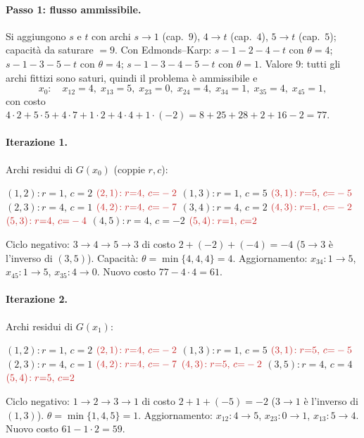 \documentclass[11pt,a4paper]{article}
\newcommand{\rd}[4]{\mbox{$(#1,#2)\!:r{=}#3,\,c{=}#4$}\hspace{1.1em}}
\newcommand{\ri}[4]{\mbox{$\textcolor{neg}{(#1,#2)\!:r{=}#3,\,c{=}#4}$}\hspace{1.1em}}
\newenvironment{resid}{\par\smallskip\noindent\small\raggedright\ignorespaces}{\par\smallskip\noindent}
\begin{document}
\begin{center}
\end{center}

\begin{sol}
\paragraph{Passo 1: flusso ammissibile.} Si aggiungono $s$ e $t$ con archi
$s\to1$ (cap.\ $9$), $4\to t$ (cap.\ $4$), $5\to t$ (cap.\ $5$); capacità da saturare $=9$.
Con Edmonds--Karp: $s\!-\!1\!-\!2\!-\!4\!-\!t$ con $\theta=4$;
$s\!-\!1\!-\!3\!-\!5\!-\!t$ con $\theta=4$; $s\!-\!1\!-\!3\!-\!4\!-\!5\!-\!t$ con $\theta=1$.
Valore $9$: tutti gli archi fittizi sono saturi, quindi il problema è ammissibile e
\[
 x_0:\quad x_{12}=4,\; x_{13}=5,\; x_{23}=0,\; x_{24}=4,\; x_{34}=1,\; x_{35}=4,\; x_{45}=1,
\]
con costo $4\cdot2+5\cdot5+4\cdot7+1\cdot2+4\cdot4+1\cdot(-2)=8+25+28+2+16-2=77$.

\paragraph{Iterazione 1.} Archi residui di $G(x_0)$ (coppie $r,c$):
\begin{resid}
\rd{1}{2}{1}{2} \ri{2}{1}{4}{-2} \rd{1}{3}{1}{5} \ri{3}{1}{5}{-5}
\rd{2}{3}{4}{1} \ri{4}{2}{4}{-7} \rd{3}{4}{4}{2} \ri{4}{3}{1}{-2}
\ri{5}{3}{4}{-4} \rd{4}{5}{4}{-2} \ri{5}{4}{1}{2}
\end{resid}
Ciclo negativo: $3\to4\to5\to3$ di costo $2+(-2)+(-4)=-4$
($5\to3$ è l'inverso di $(3,5)$). Capacità: $\theta=\min\{4,4,4\}=4$.
Aggiornamento: $x_{34}:1\to5$, $x_{45}:1\to5$, $x_{35}:4\to0$.
Nuovo costo $77-4\cdot4=61$.

\paragraph{Iterazione 2.} Archi residui di $G(x_1)$:
\begin{resid}
\rd{1}{2}{1}{2} \ri{2}{1}{4}{-2} \rd{1}{3}{1}{5} \ri{3}{1}{5}{-5}
\rd{2}{3}{4}{1} \ri{4}{2}{4}{-7} \ri{4}{3}{5}{-2} \rd{3}{5}{4}{4} \ri{5}{4}{5}{2}
\end{resid}
Ciclo negativo: $1\to2\to3\to1$ di costo $2+1+(-5)=-2$
($3\to1$ è l'inverso di $(1,3)$). $\theta=\min\{1,4,5\}=1$.
Aggiornamento: $x_{12}:4\to5$, $x_{23}:0\to1$, $x_{13}:5\to4$.
Nuovo costo $61-1\cdot2=59$.


\end{sol}
\end{document}
